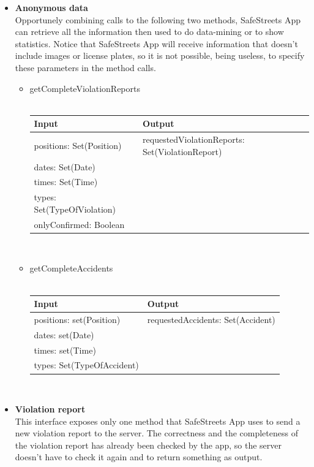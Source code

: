 \documentclass{article}
\begin{document}
		\begin{itemize}
			\item \textbf{Anonymous data}\\
				Opportunely combining calls to the following two methods, SafeStreets App can retrieve all the information then used to do data-mining or to show statistics. Notice that SafeStreets App will receive information that doesn't include images or license plates, so it is not possible, being useless, to specify these parameters in the method calls.
				\begin{itemize}
					\item{getCompleteViolationReports}\\\\
					\begin{tabular}{l | l}
						\textbf{Input} & \textbf{Output}\\
						\hline
						positions: Set(Position) & requestedViolationReports: Set(ViolationReport) \\
						dates: Set(Date) &\\
						times: Set(Time) &\\
						types: Set(TypeOfViolation) &\\
						onlyConfirmed: Boolean &\\
					\end{tabular}\\
					\item{getCompleteAccidents}\\\\
					\begin{tabular}{l | l}
						\textbf{Input} & \textbf{Output}\\
						\hline
						positions: set(Position) & requestedAccidents: Set(Accident) \\
						dates: set(Date) &\\
						times: set(Time) &\\
						types: Set(TypeOfAccident) &\\
					\end{tabular}\\
				\end{itemize}
			\item \textbf{Violation report}\\
				This interface exposes only one method that SafeStreets App uses to send a new violation report to the server. The correctness and the completeness of the violation report has already been checked by the app, so the server doesn't have to check it again and to return something as output.

\end{itemize}
\end{document}
